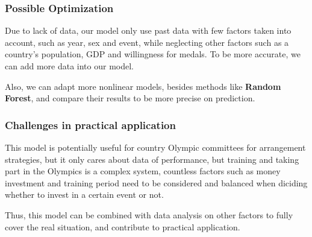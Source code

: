 \subsubsection{Possible Optimization}Due to lack of data, our model only use past data with few factors taken into account, such as year, sex and event, while neglecting other factors such as a country's population, GDP and willingness 
for medals. To be more accurate, we can add more data into our model.

Also, we can adapt more nonlinear models, besides methods like \textbf{Random Forest}, and compare their results to be more precise on prediction.
\subsubsection{Challenges in practical application}This model is potentially useful for country Olympic committees for arrangement strategies, but it only cares about data of performance, but training and taking part in the 
Olympics is a complex system, countless factors such as money investment and training period need to be considered and balanced when diciding whether to invest in a certain event or not.

Thus, this model can be combined with data analysis on other factors to fully cover the real situation, and contribute to practical application.